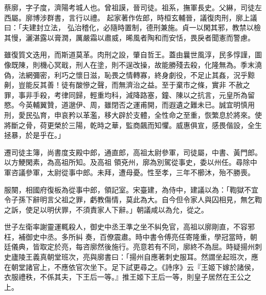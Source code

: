 
\begin{pinyinscope}

 蔡廓，字子度，濟陽考城人也。曾祖謨，晉司徒。祖系，撫軍長史。父綝，司徒左西屬。廓博涉群書，言行以禮。
 起家著作佐郎，時桓玄輔晉，議復肉刑，廓上議曰：「夫建封立法，
 弘治稽化，必隨時置制，德刑兼施。貞一以閑其邪，教禁以檢其慢，灑湛露以膏潤，厲嚴霜以肅威，晞風者陶和而安恬，畏戾者聞憲而警慮。



 雖復質文迭用，而斯道莫革。肉刑之設，肇自哲王。蓋由曩世風淳，民多惇謹，圖像既陳，則機心冥戢，刑人在塗，則不逞改操，故能勝殘去殺，化隆無為。季末澆偽，法網彌密，利巧之懷日滋，恥畏之情轉寡，終身劇役，不足止其姦，況乎黥劓，豈能反其善！徒有酸慘之聲，而無濟治之益。至于棄市之條，實非
 不赦之罪，事非手殺，考律同歸，輕重均科，減降路塞，鐘、陳以之抗言，元皇所為留愍。今英輔翼贊，道邈伊、周，雖閉否之運甫開，而遐遺之難未已。誠宜明慎用刑，愛民弘育，申哀矜以革濫，移大辟於支體，全性命之至重，恢繁息於將來。使將斷之骨，荷更榮於三陽，乾時之華，監商飆而知懼。威惠俱宣，感畏偕設，全生拯暴，於是乎在。」



 遷司徒主簿，尚書度支殿中郎，通直郎，高祖太尉參軍，司徒屬，中書、黃門郎。以方鯁閑素，為高祖所知。及高祖
 領兗州，廓為別駕從事史，委以州任。尋除中軍咨議參軍，太尉從事中郎。未拜，遭母憂。性至孝，三年不櫛沐，殆不勝喪。



 服闋，相國府復板為從事中郎，領記室。宋臺建，為侍中，建議以為：「鞫獄不宜令子孫下辭明言父祖之罪，虧教傷情，莫此為大。自今但令家人與囚相見，無乞鞫之訴，使足以明伏罪，不須責家人下辭。」朝議咸以為允，從之。



 世子左衛率謝靈運輒殺人，御史中丞王準之坐不糾免官，高祖以廓剛直，不容邪枉，補御史中丞。多所糾
 奏，百僚震肅。時中書令傅亮任寄隆重，學冠當時，朝廷儀典，皆取定於亮，每咨廓然後施行。亮意若有不同，廓終不為屈。時疑揚州刺史廬陵王義真朝堂班次，亮與廓書曰：「揚州自應著刺史服耳。然謂坐起班次，應在朝堂諸官上，不應依官次坐下。足下試更尋之。《詩序》云『王姬下嫁於諸侯，衣服禮秩，不係其夫，下王后一等。』推王姬下王后一等，則皇子居然在王公之上。




\end{pinyinscope}
